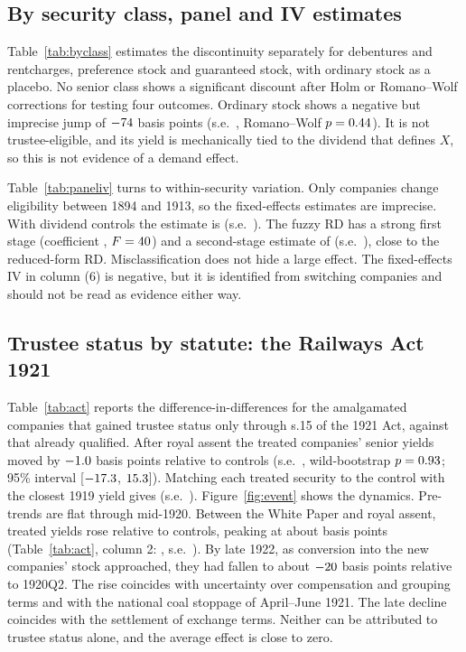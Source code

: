 \documentclass[11pt]{article}
\begin{document}
\subsection{By security class, panel and IV estimates}

Table~\ref{tab:byclass} estimates the discontinuity separately for debentures and rentcharges, preference stock and guaranteed stock, with ordinary stock as a placebo. No senior class shows a significant discount after Holm or Romano--Wolf corrections for testing four outcomes. Ordinary stock shows a negative but imprecise jump of $-74$ basis points (s.e.\ \ordSE, Romano--Wolf $p = 0.44$). It is not trustee-eligible, and its yield is mechanically tied to the dividend that defines $X$, so this is not evidence of a demand effect.

Table~\ref{tab:paneliv} turns to within-security variation. Only \nSwitchCo{} companies change eligibility between 1894 and 1913, so the fixed-effects estimates are imprecise. With dividend controls the estimate is \feTau{} (s.e.\ \feSE). The fuzzy RD has a strong first stage (coefficient \fsCoef, $F = 40$) and a second-stage estimate of \fzTau{} (s.e.\ \fzSE), close to the reduced-form RD. Misclassification does not hide a large effect. The fixed-effects IV in column (6) is negative, but it is identified from \nSwitchIV{} switching companies and should not be read as evidence either way.

\subsection{Trustee status by statute: the Railways Act 1921}

Table~\ref{tab:act} reports the difference-in-differences for the \actNtreat{} amalgamated companies that gained trustee status only through s.15 of the 1921 Act, against \actNctrl{} that already qualified. After royal assent the treated companies' senior yields moved by $-1.0$ basis points relative to controls (s.e.\ \actSE, wild-bootstrap $p = 0.93$; 95\% interval [$-17.3$, $15.3$]). Matching each treated security to the control with the closest 1919 yield gives \actMatched{} (s.e.\ \actMatchedSE). Figure~\ref{fig:event} shows the dynamics. Pre-trends are flat through mid-1920. Between the White Paper and royal assent, treated yields rose relative to controls, peaking at about \esPeak{} basis points (Table~\ref{tab:act}, column 2: \actAnn{}, s.e.\ \actAnnSE). By late 1922, as conversion into the new companies' stock approached, they had fallen to about $-20$ basis points relative to 1920Q2. The rise coincides with uncertainty over compensation and grouping terms and with the national coal stoppage of April--June 1921. The late decline coincides with the settlement of exchange terms. Neither can be attributed to trustee status alone, and the average effect is close to zero.
\end{document}
